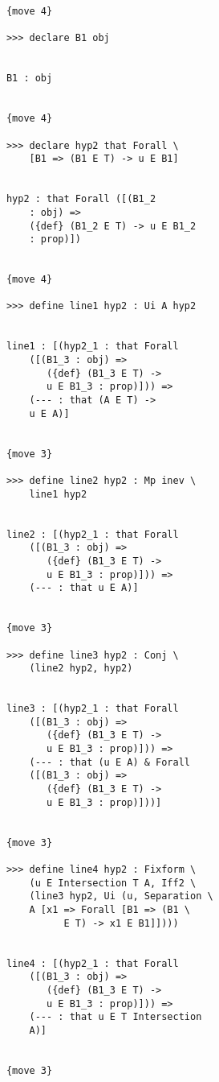 \documentclass[12pt]{article}
\begin{document}
\begin{verbatim}
            {move 4}

            >>> declare B1 obj


            B1 : obj


            {move 4}

            >>> declare hyp2 that Forall \
                [B1 => (B1 E T) -> u E B1]


            hyp2 : that Forall ([(B1_2 
                : obj) => 
                ({def} (B1_2 E T) -> u E B1_2 
                : prop)])


            {move 4}

            >>> define line1 hyp2 : Ui A hyp2


            line1 : [(hyp2_1 : that Forall 
                ([(B1_3 : obj) => 
                   ({def} (B1_3 E T) -> 
                   u E B1_3 : prop)])) => 
                (--- : that (A E T) -> 
                u E A)]


            {move 3}

            >>> define line2 hyp2 : Mp inev \
                line1 hyp2


            line2 : [(hyp2_1 : that Forall 
                ([(B1_3 : obj) => 
                   ({def} (B1_3 E T) -> 
                   u E B1_3 : prop)])) => 
                (--- : that u E A)]


            {move 3}

            >>> define line3 hyp2 : Conj \
                (line2 hyp2, hyp2)


            line3 : [(hyp2_1 : that Forall 
                ([(B1_3 : obj) => 
                   ({def} (B1_3 E T) -> 
                   u E B1_3 : prop)])) => 
                (--- : that (u E A) & Forall 
                ([(B1_3 : obj) => 
                   ({def} (B1_3 E T) -> 
                   u E B1_3 : prop)]))]


            {move 3}

            >>> define line4 hyp2 : Fixform \
                (u E Intersection T A, Iff2 \
                (line3 hyp2, Ui (u, Separation \
                A [x1 => Forall [B1 => (B1 \
                      E T) -> x1 E B1]])))


            line4 : [(hyp2_1 : that Forall 
                ([(B1_3 : obj) => 
                   ({def} (B1_3 E T) -> 
                   u E B1_3 : prop)])) => 
                (--- : that u E T Intersection 
                A)]


            {move 3}


\end{verbatim}
\end{document}
